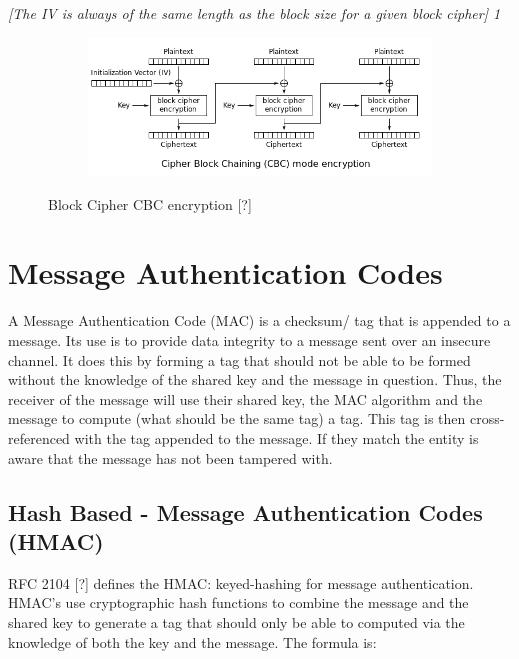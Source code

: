\documentclass[bsc,frontabs,twoside,singlespacing,parskip,deptreport]{infthesis}     %
\begin{document}
\textit{[The IV is always of the same length as the block size for a given block cipher] 1}

\begin{figure}[H]
\centering
\begin{subfigure}{1.0\textwidth}
  \includegraphics[width=1\linewidth]
  {images/crypto/cbc.png}
\end{subfigure}
\caption{Block Cipher CBC encryption [?]}
\end{figure}

\section{Message Authentication Codes}

A Message Authentication Code (MAC) is a checksum/ tag that is appended to a message. Its use is to provide data integrity to a message sent over an insecure channel. It does this by forming a tag that should not be able to be formed without the knowledge of the shared key and the message in question. Thus, the receiver of the message will use their shared key, the MAC algorithm and the message to compute (what should be the same tag) a tag. This tag is then cross-referenced with the tag appended to the message. If they match the entity is aware that the message has not been tampered with.

\subsection{Hash Based - Message Authentication Codes (HMAC)}

RFC 2104 [?] defines the HMAC: keyed-hashing for message authentication. HMAC's use cryptographic hash functions to combine the message and the shared key to generate a tag that should only be able to computed via the knowledge of both the key and the message. The formula is:
\end{document}

